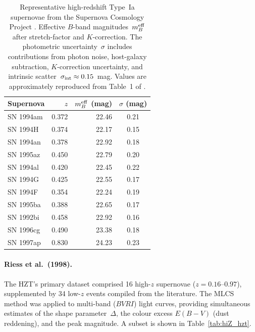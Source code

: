 \documentclass[12pt]{article}
\begin{document}
\begin{table}[ht]
\centering
\caption{Representative high-redshift Type~Ia supernovae from the
Supernova Cosmology Project \citep{Perlmutter1999}.  Effective
$B$-band magnitudes~$m_B^{\rm eff}$ after stretch-factor and
$K$-correction.  The photometric uncertainty~$\sigma$ includes
contributions from photon noise, host-galaxy subtraction, $K$-correction
uncertainty, and intrinsic scatter~$\sigma_{\rm int} \approx 0.15$~mag.
Values are approximately reproduced from Table~1 of
\citet{Perlmutter1999}.}
\label{tab:hiZ_scp}
\medskip
\begin{tabular}{lrrc}
\toprule
Supernova & $z$ & $m_B^{\rm eff}$ (mag) & $\sigma$ (mag) \\
\midrule
SN 1994am & 0.372 & 22.46 & 0.21 \\
SN 1994H  & 0.374 & 22.17 & 0.15 \\
SN 1994an & 0.378 & 22.92 & 0.18 \\
SN 1995az & 0.450 & 22.79 & 0.20 \\
SN 1994al & 0.420 & 22.45 & 0.22 \\
SN 1994G  & 0.425 & 22.55 & 0.17 \\
SN 1994F  & 0.354 & 22.24 & 0.19 \\
SN 1995ba & 0.388 & 22.65 & 0.17 \\
SN 1992bi & 0.458 & 22.92 & 0.16 \\
SN 1996cg & 0.490 & 23.38 & 0.18 \\
SN 1997ap & 0.830 & 24.23 & 0.23 \\
\bottomrule
\end{tabular}
\end{table}

\paragraph{Riess et al.\ (1998).}  The HZT's primary dataset comprised
16 high-$z$ supernovae ($z = 0.16$--$0.97$), supplemented by 34
low-$z$ events compiled from the literature.  The MLCS method was
applied to multi-band ($BVRI$) light curves, providing simultaneous
estimates of the shape parameter~$\Delta$, the colour excess
$E(B-V)$ (dust reddening), and the peak magnitude.  A subset is
shown in Table~\ref{tab:hiZ_hzt}.
\end{document}
